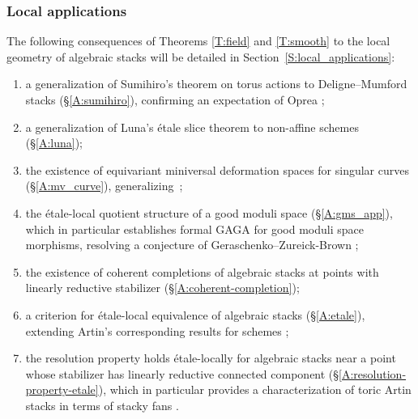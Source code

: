 \documentclass[a4paper]{amsart}
\theoremstyle{plain}
\theoremstyle{definition}
\theoremstyle{remark}
\numberwithin{equation}{section}
\begin{document}
\subsubsection*{Local applications} The following consequences of Theorems \ref{T:field} and \ref{T:smooth} to the local geometry of algebraic stacks will be detailed in Section~\ref{S:local_applications}: 
\begin{enumerate}
\item  a generalization of Sumihiro's theorem on torus actions to Deligne--Mumford stacks 
  (\S\ref{A:sumihiro}), confirming an expectation of Oprea \cite[\S2]{oprea};
\item a generalization of Luna's \'etale slice theorem to non-affine schemes 
  (\S\ref{A:luna});
\item the existence of equivariant miniversal deformation spaces for singular curves (\S\ref{A:mv_curve}), generalizing~\cite{alper-kresch};
\item the \'etale-local quotient structure of a good moduli space (\S\ref{A:gms_app}), which in particular establishes formal GAGA for good moduli space morphisms, resolving a conjecture of Geraschenko--Zureick-Brown \cite[Conj.\ 32]{geraschenko-brown};
\item the existence of coherent completions of algebraic stacks at points with linearly reductive stabilizer (\S\ref{A:coherent-completion});
\item a criterion for \'etale-local equivalence of algebraic stacks (\S\ref{A:etale}), 
  extending Artin's corresponding results for schemes \cite[Cor.~2.6]{artin-approx};

\item the resolution property holds \'etale-locally for algebraic stacks near a point whose stabilizer has linearly reductive connected component (\S\ref{A:resolution-property-etale}), which in particular provides a characterization of toric Artin stacks in terms of stacky fans  \cite[Thm.~6.1]{GS-toric-stacks-2}.

\end{enumerate}
\end{document}
